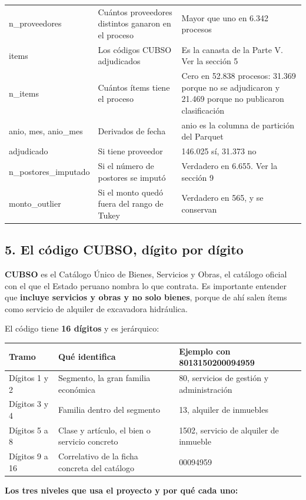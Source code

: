 \documentclass[11pt]{article}
\begin{document}
\begin{center}
\begin{tabularx}{\linewidth}{Q{0.454}Q{0.534}Q{2.011}}
n\_\allowbreak{}proveedores & Cuántos proveedores distintos ganaron en el proceso & Mayor que uno en 6.342 procesos \\
items & Los códigos CUBSO adjudicados & Es la canasta de la Parte V. Ver la sección 5 \\
n\_\allowbreak{}items & Cuántos ítems tiene el proceso & Cero en 52.838 procesos: 31.369 porque no se adjudicaron y 21.469 porque no publicaron clasificación \\
anio, mes, anio\_\allowbreak{}mes & Derivados de fecha & anio es la columna de partición del Parquet \\
adjudicado & Si tiene proveedor & 146.025 sí, 31.373 no \\
n\_\allowbreak{}postores\_\allowbreak{}imputado & Si el número de postores se imputó & Verdadero en 6.655. Ver la sección 9 \\
monto\_\allowbreak{}outlier & Si el monto quedó fuera del rango de Tukey & Verdadero en 565, y se conservan \\
\bottomrule
\end{tabularx}
\end{center}
\subsection*{5. El código CUBSO, dígito por dígito}
\textbf{CUBSO} es el Catálogo Único de Bienes, Servicios y Obras, el catálogo oficial con el que el Estado peruano nombra lo que contrata. Es importante entender que \textbf{incluye servicios y obras y no solo bienes}, porque de ahí salen ítems como servicio de alquiler de excavadora hidráulica.

El código tiene \textbf{16 dígitos} y es jerárquico:

\begin{center}\footnotesize
\begin{tabularx}{\linewidth}{Q{0.420}Q{1.350}Q{1.230}}
\toprule
\textbf{Tramo} & \textbf{Qué identifica} & \textbf{Ejemplo con 8013150200094959} \\
\midrule
Dígitos 1 y 2 & Segmento, la gran familia económica & 80, servicios de gestión y administración \\
Dígitos 3 y 4 & Familia dentro del segmento & 13, alquiler de inmuebles \\
Dígitos 5 a 8 & Clase y artículo, el bien o servicio concreto & 1502, servicio de alquiler de inmueble \\
Dígitos 9 a 16 & Correlativo de la ficha concreta del catálogo & 00094959 \\
\bottomrule
\end{tabularx}
\end{center}
\textbf{Los tres niveles que usa el proyecto y por qué cada uno:}
\end{document}
